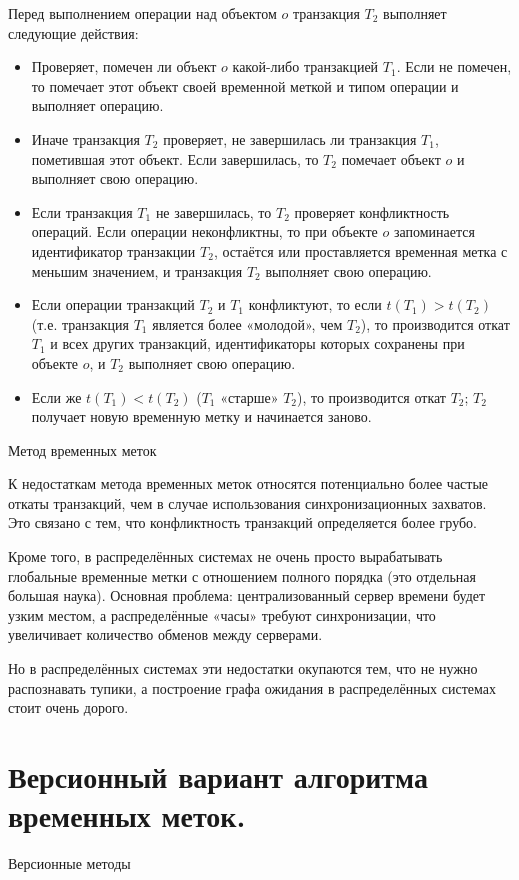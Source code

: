 \documentclass[a4paper,12pt]{article}
\begin{document}
Перед выполнением операции над объектом $o$ транзакция $T_2$ выполняет следующие действия:
\begin{itemize}
    \item Проверяет, помечен ли объект $o$ какой-либо транзакцией $T_1$. Если не помечен, то помечает этот объект своей временной меткой и типом операции и выполняет операцию.
    \item Иначе транзакция $T_2$ проверяет, не завершилась ли транзакция $T_1$, пометившая этот объект. Если завершилась, то $T_2$ помечает объект $o$ и выполняет свою операцию.
    \item Если транзакция $T_1$ не завершилась, то $T_2$ проверяет конфликтность операций. Если операции неконфликтны, то при объекте $o$ запоминается идентификатор транзакции $T_2$, остаётся или проставляется временная метка с меньшим значением, и транзакция $T_2$ выполняет свою операцию.
    \item Если операции транзакций $T_2$ и $T_1$ конфликтуют, то если $t(T_1) > t(T_2)$ (т.е. транзакция $T_1$ является более «молодой», чем $T_2$), то производится откат $T_1$ и всех других транзакций, идентификаторы которых сохранены при объекте $o$, и $T_2$ выполняет свою операцию.
    \item Если же $t(T_1) < t(T_2)$ ($T_1$ «старше» $T_2$), то производится откат $T_2$; $T_2$ получает новую временную метку и начинается заново.
\end{itemize}

Метод временных меток

К недостаткам метода временных меток относятся потенциально более частые откаты транзакций, чем в случае использования синхронизационных захватов. Это связано с тем, что конфликтность транзакций определяется более грубо.

Кроме того, в распределённых системах не очень просто вырабатывать глобальные временные метки с отношением полного порядка (это отдельная большая наука). Основная проблема: централизованный сервер времени будет узким местом, а распределённые «часы» требуют синхронизации, что увеличивает количество обменов между серверами.

Но в распределённых системах эти недостатки окупаются тем, что не нужно распознавать тупики, а построение графа ожидания в распределённых системах стоит очень дорого.

\section{Версионный вариант алгоритма временных меток.}
Версионные методы
\end{document}
